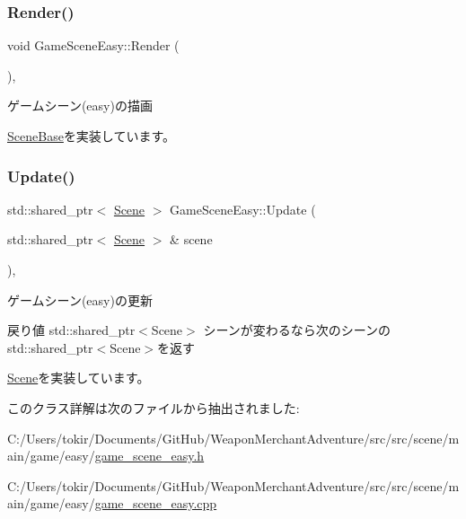 \mbox{\label{class_game_scene_easy_ad2cbe509b1f81f0e3b4d1656466dabd3}} 
\subsubsection{\texorpdfstring{Render()}{Render()}}
{\footnotesize\ttfamily void Game\+Scene\+Easy\+::\+Render (\begin{DoxyParamCaption}{ }\end{DoxyParamCaption})\hspace{0.3cm}{\ttfamily [final]}, {\ttfamily [virtual]}}



ゲームシーン(easy)の描画 



\mbox{\hyperlink{class_scene_base_ad981674ce731ea267f398e889bbb9dc3}{Scene\+Base}}を実装しています。

\mbox{\label{class_game_scene_easy_ac2bccbf61722010fd6f317693ee7b8b1}} 
\subsubsection{\texorpdfstring{Update()}{Update()}}
{\footnotesize\ttfamily std\+::shared\+\_\+ptr$<$ \mbox{\hyperlink{class_scene}{Scene}} $>$ Game\+Scene\+Easy\+::\+Update (\begin{DoxyParamCaption}\item[{std\+::shared\+\_\+ptr$<$ \mbox{\hyperlink{class_scene}{Scene}} $>$ \&}]{scene }\end{DoxyParamCaption})\hspace{0.3cm}{\ttfamily [final]}, {\ttfamily [virtual]}}



ゲームシーン(easy)の更新 

\begin{DoxyReturn}{戻り値}
std\+::shared\+\_\+ptr$<$\+Scene$>$ シーンが変わるなら次のシーンのstd\+::shared\+\_\+ptr$<$\+Scene$>$を返す 
\end{DoxyReturn}


\mbox{\hyperlink{class_scene_ab71ee5f19764b90c87b4574aa1cb1d25}{Scene}}を実装しています。



このクラス詳解は次のファイルから抽出されました\+:\begin{DoxyCompactItemize}
\item 
C\+:/\+Users/tokir/\+Documents/\+Git\+Hub/\+Weapon\+Merchant\+Adventure/src/src/scene/main/game/easy/\mbox{\hyperlink{game__scene__easy_8h}{game\+\_\+scene\+\_\+easy.\+h}}\item 
C\+:/\+Users/tokir/\+Documents/\+Git\+Hub/\+Weapon\+Merchant\+Adventure/src/src/scene/main/game/easy/\mbox{\hyperlink{game__scene__easy_8cpp}{game\+\_\+scene\+\_\+easy.\+cpp}}\end{DoxyCompactItemize}
